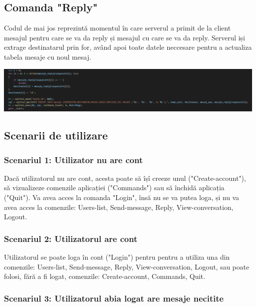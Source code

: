 \documentclass[a4paper,12pt]{article}
\begin{document}
\subsection{Comanda "Reply"}

\tab
Codul de mai jos reprezintă momentul în care serverul a primit de la client mesajul pentru care se va da reply și mesajul cu care se va da reply. Serverul iși extrage destinatarul prin for, având apoi toate datele neccesare pentru a actualiza tabela mesaje cu noul mesaj.

\bigskip
\begin{center}
\includegraphics[width=1.0\textwidth]{Reply.png}
\end{center}

\subsection{Scenarii de utilizare}

\subsubsection {Scenariul 1: Utilizator nu are cont}

\tab
Dacă utilizatorul nu are cont, acesta poate să îșî creeze unul ("Create-account"), să vizualizeze comenzile aplicației ("Commands") sau să închidă aplicația ("Quit"). Va avea acces la comanda "Login", însă nu se va putea loga, și nu va avea acces la comenzile: Users-list, Send-message, Reply, View-conversation, Logout.

\subsubsection {Scenariul 2: Utilizatorul are cont}

\tab
Utilizatorul se poate loga în cont ("Login") pentru pentru a utiliza una din comenzile: Users-list, Send-message, Reply, View-conversation, Logout, sau poate folosi, fără a fi logat, comenzile: Create-account, Commands, Quit.

\subsubsection {Scenariul 3: Utilizatorul abia logat are mesaje necitite}
\end{document}
